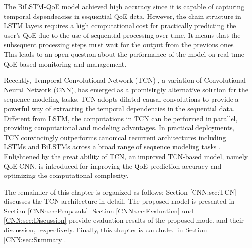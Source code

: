 The BiLSTM-QoE model achieved high accuracy since it is capable of capturing temporal dependencies in sequential QoE data.
However, the chain structure in LSTM layers requires a high computational cost for practically predicting the user's QoE due to the use of sequential processing over time.
It means that the subsequent processing steps must wait for the output from the previous ones.
This leads to an open question about the performance of the model on real-time QoE-based monitoring and management.

Recently, Temporal Convolutional Network (TCN) \cite{Network_TCN}, a variation of Convolutional Neural Network (CNN), has emerged as a promisingly alternative solution for the sequence modeling tasks.
TCN adopts dilated causal convolutions \cite{Network_Dilated1, Network_Dilated2, Network_Dilated3} to provide a powerful way of extracting the temporal dependencies in the sequential data.
Different from LSTM, the computations in TCN can be performed in parallel, providing computational and modeling advantages.
In practical deployments, TCN convincingly outperforms canonical recurrent architectures including LSTMs and BiLSTMs across a broad range of sequence modeling tasks \cite{Network_TCN}.
Enlightened by the great ability of TCN, an improved TCN-based model, namely QoE-CNN, is introduced for improving the QoE prediction accuracy and optimizing the computational complexity.

The remainder of this chapter is organized as follows:
Section \ref{CNN:sec:TCN} discusses the TCN architecture in detail.
The proposed model is presented in Section \ref{CNN:sec:Proposals}.
Section \ref{CNN:sec:Evaluation} and \ref{CNN:sec:Discussion} provide evaluation results of the proposed model and their discussion, respectively.
Finally, this chapter is concluded in Section \ref{CNN:sec:Summary}.